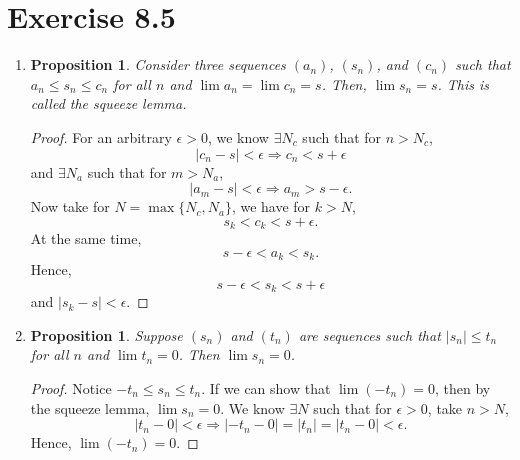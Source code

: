 \documentclass{article}
\newtheorem{proposition}[thm]{Proposition}
\begin{document}
\section*{Exercise 8.5}
\begin{enumerate}[label=(\alph*)]
    \item 
    \begin{proposition}
        Consider three sequences $(a_n)$, $(s_n)$, and $(c_n)$ such that $a_n \leq s_n \leq c_n$ 
        for all $n$ and $\lim a_n = \lim c_n = s$. Then, $\lim s_n = s$. This is called the 
        \textit{squeeze lemma}.
    \end{proposition}
    \begin{proof}
        For an arbitrary $\epsilon>0$, we know $\exists N_c$ such that for $n > N_c$, $$|c_n-s|<\epsilon\Rightarrow 
        c_n<s+\epsilon$$ and $\exists N_a$ such that for $m>N_a$, $$|a_m-s|<\epsilon\Rightarrow a_m>s-\epsilon.$$ 
        Now take for $N = \max\{N_c, N_a\}$, we have for $k>N$, $$s_k<c_k<s+
        \epsilon.$$ At the same time, $$s-\epsilon<a_k<s_k.$$ Hence, 
        $$s-\epsilon < s_k < s + \epsilon$$ and $|s_k-s| < \epsilon.$
    \end{proof}
    \item 
    \begin{proposition}
        Suppose $(s_n)$ and $(t_n)$ are sequences such that $|s_n| \leq t_n$ for all $n$ and 
        $\lim t_n = 0$. Then $\lim s_n = 0$.
    \end{proposition}
    \begin{proof}
        Notice $-t_n\le s_n\le t_n$. If we can show that $\lim (-t_n) = 0$, then by the squeeze 
        lemma, $\lim s_n = 0$. We know $\exists N$ such that for $\epsilon>0$, take $n>N$, 
        $$|t_n-0|<\epsilon\Rightarrow|-t_n-0| = |t_n| = |t_n - 0|<\epsilon.$$
        Hence, $\lim (-t_n) = 0$.
    \end{proof}
\end{enumerate}
\end{document}
